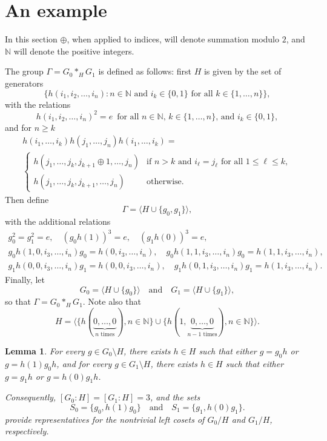 \documentclass[a4paper]{amsart}
\theoremstyle{plain}
\newtheorem{lemma}[theorem]{Lemma}
\theoremstyle{definition}
\theoremstyle{remark}
\newcommand{\N}{\mathbb{N}}
\numberwithin{theorem}{section}
\begin{document}
\section{An example}\label{sec:example}

In this section $\oplus$, when applied to indices, will denote summation modulo $2$, and $\N$ will denote the positive integers.

The group $\Gamma = G_0 *_H G_1$ is defined as follows: first $H$ is given by the set of generators
\[
\{ h(i_1,i_2,\dotsc,i_n) : \text{$n\in\N$ and $i_k\in\{0,1\}$ for all $k\in\{1,\dotsc,n\}$}\},
\]
with the relations
\[
h(i_1,i_2,\dotsc,i_n)^2 = e \, \text{ for all $n\in\N$, $k\in\{1,\dotsc,n\}$, and $i_k \in \{0,1\}$},
\]
and for $n\geq k$
\begin{multline*}
h(i_1,\dotsc,i_k) h(j_1,\dotsc,j_n) h(i_1,\dotsc,i_k) = \\
\begin{cases}
h(j_1, \dotsc, j_k, j_{k+1} \oplus 1, \dotsc, j_n) & \text{if $n>k$ and $i_\ell = j_\ell$ for all $1\leq\ell\leq k$}, \\
h(j_1, \dotsc, j_k, j_{k+1}, \dotsc, j_n) & \text{otherwise}.
\end{cases}
\end{multline*}
Then define
\[
\Gamma=\langle H\cup\{ g_0, g_1 \}\rangle,
\]
with the additional relations
\begin{gather*}
g_0^2 = g_1^2 = e,\quad (g_0 h(1))^3 = e, \quad  (g_1 h(0))^3 = e, \\
g_0 h(1, 0, i_3, \dotsc, i_n) g_0 = h(0, i_3, \dotsc, i_n),
\quad 
g_0 h(1, 1, i_3, \dotsc, i_n) g_0 = h(1, 1, i_3, \dotsc, i_n), \\
g_1 h(0, 0, i_3, \dotsc, i_n) g_1 = h(0, 0, i_3, \dotsc, i_n),
\quad
g_1 h(0, 1, i_3, \dotsc, i_n) g_1 = h(1, i_3, \dotsc, i_n).
\end{gather*}
Finally, let
\[
G_0=\langle H\cup\{ g_0 \}\rangle
\quad\text{and}\quad
G_1=\langle H\cup\{ g_1 \}\rangle,
\]
so that $\Gamma = G_0 *_H G_1$.
Note also that
\[
H = \langle \{h(\underbrace{0,\dotsc,0}_{n \text{ times}}), n\in\N \}
\cup
\{h(1,\underbrace{0,\dotsc,0}_{n-1 \text{ times}}),n\in\N \} \rangle.
\]
\begin{lemma}
For every $g\in G_0\setminus H$, there exists $h\in H$ such that either $g=g_0h$ or $g=h(1)g_0h$,
and for every $g\in G_1\setminus H$, there exists $h\in H$ such that either $g=g_1h$ or $g=h(0)g_1h$.

Consequently, $[G_0 : H] = [G_1 : H] = 3$, and the sets
\begin{equation}\label{eq:coset-rep}
S_0=\{g_0,h(1)g_0\} \quad\text{and}\quad S_1=\{g_1,h(0)g_1\}.
\end{equation}
provide representatives for the nontrivial left cosets of $G_0/H$ and $G_1/H$, respectively.
\end{lemma}
\end{document}
